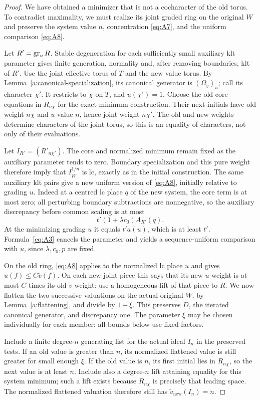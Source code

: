 \begin{proof}
We have obtained a minimizer that is not a cocharacter of the old torus.
To contradict maximality, we must realize its joint graded ring on the
original \(W\) and preserve the system value \(n\), concentration
\eqref{eq:A7}, and the uniform comparison \eqref{eq:A8}.

Let \(R'=\operatorname{gr}_uR\). Stable degeneration for each sufficiently small
auxiliary klt parameter gives finite generation, normality and, after
removing boundaries, klt of \(R'\). Use the joint effective torus of
\(T\) and the new value torus. By
Lemma~\ref{a:canonical-specialization}, its canonical generator is
\((\Omega_{\tilde v})_u\); call its character \(\chi'\). It restricts
to \(\chi\) on \(T\), and \(u(\chi')=1\).
Choose the old core equations in \(R_{n\chi}\) for the exact-minimum
construction. Their next initials have old weight \(n\chi\) and
\(u\)-value \(n\), hence joint weight \(n\chi'\). The old and new
weights determine characters of the joint torus, so this is an equality
of characters, not only of their evaluations.

Let \(I_{R'}=(R'_{n\chi'})\). The core and normalized minimum remain
fixed as the auxiliary parameter tends to zero. Boundary specialization
and this pure weight therefore imply that \(I_{R'}^{1/n}\) is lc,
exactly as in the initial construction. The same auxiliary klt pairs give
a new uniform version of \eqref{eq:A8}, initially relative to grading
\(u\). Indeed at a centred lc place \(q\) of the new system, the core
term is at most zero; all perturbing boundary subtractions are
nonnegative, so the auxiliary discrepancy before common scaling is at
most
\[
                   t'(1+\lambda c_0)A_{R'}(q).
\]
At the minimizing grading \(u\) it equals \(t'a(u)\), which is at
least \(t'\). Formula~\eqref{eq:A3} cancels the parameter and yields
a sequence-uniform comparison with \(u\), since \(\lambda,c_0,p\) are
fixed.

On the old ring, \eqref{eq:A8} applies to the normalized lc place \(u\)
and gives \(u(f)\leq C\tilde v(f)\). On each new joint piece this says
that its new \(u\)-weight is at most \(C\) times its old
\(\tilde v\)-weight: use a homogeneous lift of that piece to \(R\).
We now flatten the two successive valuations on the actual original
\(W\), by Lemma~\ref{a:flattening}, and divide by \(1+\xi\).
This preserves \(D\), the iterated canonical generator, and discrepancy
one. The parameter \(\xi\) may be chosen individually for each member;
all bounds below use fixed factors.

Include a finite degree-\(n\) generating list for the actual ideal
\(I_n\) in the preserved tests. If an old value is greater than \(n\),
its normalized flattened value is still greater for small enough
\(\xi\). If the old value is \(n\), its first initial lies in
\(R_{n\chi}\), so the next value is at least \(n\). Include also a
degree-\(n\) lift attaining equality for this system minimum; such a
lift exists because \(R_{n\chi}\) is precisely that leading space.
The normalized flattened valuation therefore still has
\(\tilde v_{\mathrm{new}}(I_n)=n\).


\end{proof}

